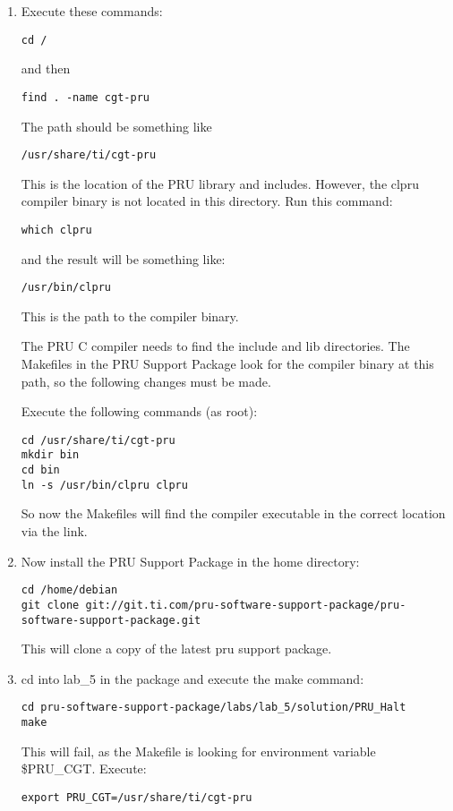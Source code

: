 \begin{enumerate}
\item  Execute these commands:
\begin{verbatim}
cd /
\end{verbatim} and then 
\begin{verbatim}
find . -name cgt-pru
\end{verbatim}

The path should be something like 
\begin{verbatim}
/usr/share/ti/cgt-pru
\end{verbatim}  

This is the location of the PRU library and includes.
However, the clpru compiler binary is not located in this directory.  Run this command:
\begin{verbatim}
which clpru
\end{verbatim}
and the result will be something like:
\begin{verbatim}
/usr/bin/clpru
\end{verbatim}
This is the path to the compiler binary.

The PRU C compiler needs to find the include and lib directories.  The Makefiles in the PRU Support Package look for the compiler binary at this path, so the following changes must be made.

Execute the following commands (as root):
\begin{verbatim}
cd /usr/share/ti/cgt-pru
mkdir bin
cd bin
ln -s /usr/bin/clpru clpru
\end{verbatim}
So now the Makefiles will find the compiler executable in the correct location via the link.
\item  Now install the PRU Support Package in the home directory:

\begin{verbatim}
cd /home/debian
git clone git://git.ti.com/pru-software-support-package/pru-software-support-package.git
\end{verbatim}

This will clone a copy of the latest pru support package.
\item  cd into lab\_5 in the package and execute the make command:
\begin{verbatim}
cd pru-software-support-package/labs/lab_5/solution/PRU_Halt
make
\end{verbatim}
This will fail, as the Makefile is looking for environment variable \$PRU\_CGT.  Execute:

\begin{verbatim}
export PRU_CGT=/usr/share/ti/cgt-pru
\end{verbatim}


\end{enumerate}

